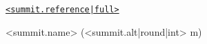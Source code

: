 \begin{minipage}{\textwidth}\centering
\fontsize{25pt}{0pt}\selectfont \href{https://summits.sota.org.uk/summit/<summit.reference|full>}\texttt{<summit.reference|full>}\par
\fontsize{10pt}{0pt}\selectfont <summit.name> (<summit.alt|round|int> m)\par
\end{minipage}\par
